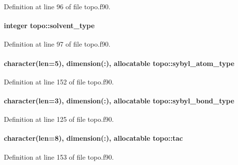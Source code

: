 Definition at line 96 of file topo.\-f90.

\hypertarget{classtopo_a6e2eb29b8d19028c7ee9ba06b64359ad}{
\paragraph[{solvent\-\_\-type}]{\setlength{\rightskip}{0pt plus 5cm}integer topo\-::solvent\-\_\-type}}\label{classtopo_a6e2eb29b8d19028c7ee9ba06b64359ad}


Definition at line 97 of file topo.\-f90.

\hypertarget{classtopo_a54b45b6eb47a65ecff972da7e73e7ffe}{
\paragraph[{sybyl\-\_\-atom\-\_\-type}]{\setlength{\rightskip}{0pt plus 5cm}character(len=5), dimension(\-:), allocatable topo\-::sybyl\-\_\-atom\-\_\-type}}\label{classtopo_a54b45b6eb47a65ecff972da7e73e7ffe}


Definition at line 152 of file topo.\-f90.

\hypertarget{classtopo_a0bd8eb8a9acd81024eda5ce4abbec08e}{
\paragraph[{sybyl\-\_\-bond\-\_\-type}]{\setlength{\rightskip}{0pt plus 5cm}character(len=3), dimension(\-:), allocatable topo\-::sybyl\-\_\-bond\-\_\-type}}\label{classtopo_a0bd8eb8a9acd81024eda5ce4abbec08e}


Definition at line 125 of file topo.\-f90.

\hypertarget{classtopo_a61a2ce9eb3fbc2b8c978de51e0c8c232}{
\paragraph[{tac}]{\setlength{\rightskip}{0pt plus 5cm}character(len=8), dimension(\-:), allocatable topo\-::tac}}\label{classtopo_a61a2ce9eb3fbc2b8c978de51e0c8c232}


Definition at line 153 of file topo.\-f90.

